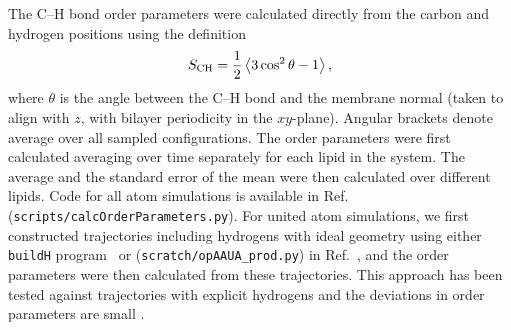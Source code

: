 \documentclass[journal=jpcbfk]{achemso}
\begin{document}
The C--H bond order parameters were calculated directly
from the carbon and hydrogen positions using the definition
\begin{equation}
S_{\rm CH}=\frac{1}{2}\left\langle 3\cos^2\theta -1 \right\rangle,
\end{equation}
where $\theta$ is the angle between the C--H bond and the membrane normal
(taken to align with $z$, with bilayer periodicity in the $xy$-plane).
Angular brackets denote average over all sampled configurations.
The order parameters were first calculated averaging over time separately
for each lipid in the system. The average and
the standard error of the mean were then calculated over different lipids.
Code for all atom simulations is available in Ref.~ (\texttt{scripts/calcOrderParameters.py}).
For united atom simulations, we first constructed trajectories including hydrogens with ideal geometry using either \texttt{buildH} program~\cite{buildH} or (\texttt{scratch/opAAUA\_prod.py}) in  Ref.~, and the order parameters were then calculated from these trajectories. This approach has been tested against trajectories with explicit hydrogens and the deviations in order parameters are small \cite{buildH,piggot17}.\\
\end{document}
